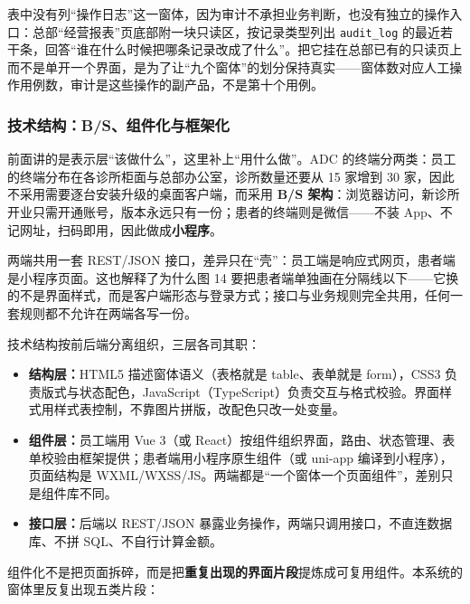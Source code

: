 \documentclass[11pt,a4paper]{ctexart}
\begin{document}
表中没有列“操作日志”这一窗体，因为审计不承担业务判断，也没有独立的操作入口：总部“经营报表”页底部附一块只读区，按记录类型列出 \texttt{audit\_log} 的最近若干条，回答“谁在什么时候把哪条记录改成了什么”。把它挂在总部已有的只读页上而不是单开一个界面，是为了让“九个窗体”的划分保持真实——窗体数对应人工操作用例数，审计是这些操作的副产品，不是第十个用例。

\subsubsection{技术结构：B/S、组件化与框架化}

前面讲的是表示层“该做什么”，这里补上“用什么做”。ADC 的终端分两类：员工的终端分布在各诊所柜面与总部办公室，诊所数量还要从 15 家增到 30 家，因此不采用需要逐台安装升级的桌面客户端，而采用 \textbf{B/S 架构}：浏览器访问，新诊所开业只需开通账号，版本永远只有一份；患者的终端则是微信——不装 App、不记网址，扫码即用，因此做成\textbf{小程序}。

两端共用一套 REST/JSON 接口，差异只在“壳”：员工端是响应式网页，患者端是小程序页面。这也解释了为什么图 14 要把患者端单独画在分隔线以下——它换的不是界面样式，而是客户端形态与登录方式；接口与业务规则完全共用，任何一套规则都不允许在两端各写一份。

技术结构按前后端分离组织，三层各司其职：

\begin{itemize}[leftmargin=1.6em,topsep=2pt,itemsep=2pt]
  \item \textbf{结构层：}HTML5 描述窗体语义（表格就是 table、表单就是 form），CSS3 负责版式与状态配色，JavaScript（TypeScript）负责交互与格式校验。界面样式用样式表控制，不靠图片拼版，改配色只改一处变量。
  \item \textbf{组件层：}员工端用 Vue 3（或 React）按组件组织界面，路由、状态管理、表单校验由框架提供；患者端用小程序原生组件（或 uni-app 编译到小程序），页面结构是 WXML/WXSS/JS。两端都是“一个窗体一个页面组件”，差别只是组件库不同。
  \item \textbf{接口层：}后端以 REST/JSON 暴露业务操作，两端只调用接口，不直连数据库、不拼 SQL、不自行计算金额。
\end{itemize}

组件化不是把页面拆碎，而是把\textbf{重复出现的界面片段}提炼成可复用组件。本系统的窗体里反复出现五类片段：
\end{document}
